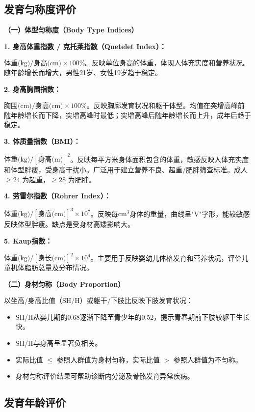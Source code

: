 \subsection{发育匀称度评价}

\begin{keybox}
\textbf{（一）体型匀称度（Body Type Indices）}

\textbf{1. 身高体重指数 / 克托莱指数（Quetelet Index）：}

$\text{体重(kg)} / \text{身高(cm)} \times 100\%$。反映单位身高的体重，体现人体充实度和营养状况。随年龄增长而增大，男性21岁、女性19岁趋于稳定。

\textbf{2. 身高胸围指数：}

$\text{胸围(cm)} / \text{身高(cm)} \times 100\%$。反映胸廓发育状况和躯干体型。均值在突增高峰前随年龄增长而下降，突增高峰时最低；突增高峰后随年龄增长而上升，成年后趋于稳定。

\textbf{3. 体质量指数（BMI）：}

$\text{体重(kg)} / [\text{身高(m)}]^2$。反映每平方米身体面积包含的体重，敏感反映人体充实度和体型胖瘦，受身高干扰小。广泛用于建立营养不良、超重/肥胖筛查标准。成人 $\geq 24$ 为超重，$\geq 28$ 为肥胖。

\textbf{4. 劳雷尔指数（Rohrer Index）：}

$\text{体重(kg)} / [\text{身高(cm)}]^3 \times 10^7$。反映每$\mathrm{cm}^3$身体的重量，曲线呈"V"字形，能较敏感反映体型胖瘦。缺点是受身材高矮影响大。

\textbf{5. Kaup指数：}

$\text{体重(kg)} / [\text{身长(cm)}]^2 \times 10^4$。主要用于反映婴幼儿体格发育和营养状况，评价儿童机体脂肪总量及分布情况。

\textbf{（二）身材匀称（Body Proportion）}

以坐高/身高比值（SH/H）或躯干/下肢比反映下肢发育状况：

\begin{itemize}[leftmargin=*]
    \item SH/H从婴儿期的0.68逐渐下降至青少年的0.52，提示青春期前下肢较躯干生长快。
    \item SH/H与身高呈显著负相关。
    \item 实际比值 $\leq$ 参照人群值为身材匀称，实际比值 $>$ 参照人群值为不匀称。
    \item 身材匀称评价结果可帮助诊断内分泌及骨骼发育异常疾病。
\end{itemize}
\end{keybox}

\subsection{发育年龄评价}

